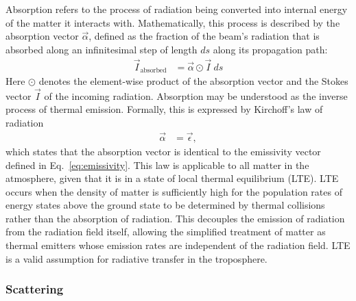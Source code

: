 Absorption refers to the process of radiation being converted into internal
energy of the matter it interacts with. Mathematically, this process is
described by the absorption vector $\vec{\alpha}$, defined as the fraction of
the beam's radiation that is absorbed along an infinitesimal step of length $ds$
along its propagation path:
\begin{align}
\vec{I}_\text{absorbed} &= \vec{\alpha} \odot \vec{I} \ ds
\end{align}
Here $\odot$ denotes the element-wise product of the absorption vector and
the Stokes vector $\vec{I}$ of the incoming radiation. Absorption may be
understood as the inverse process of thermal emission. Formally, this is
expressed by Kirchoff's  law of radiation
\begin{align}
  \vec{\alpha} &= \vec{\epsilon},
\end{align}
which states that the absorption vector is identical to the emissivity vector
defined in Eq.~\ref{eq:emissivity}. This law is applicable to all matter in the
atmosphere, given that it is in a state of local thermal equilibrium (LTE). LTE
occurs when the density of matter is sufficiently high for the population
rates of energy states above the ground state to be determined by thermal
collisions rather than the absorption of radiation. This decouples the emission
of radiation from the radiation field itself, allowing the simplified treatment
of matter as thermal emitters whose emission rates are independent of the
radiation field. LTE is a valid assumption for radiative transfer in the
troposphere.

\subsubsection{Scattering}

